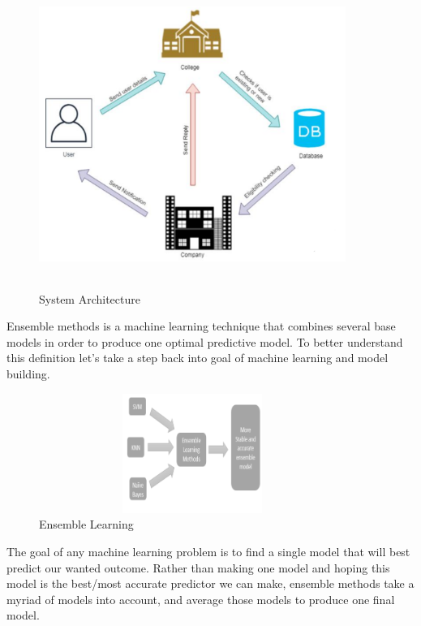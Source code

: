 \documentclass[12pt]{article}
\begin{document}
\begin{figure}[H]
\begin{center}
 \includegraphics[width=10cm, height=10cm]{L1P1}
\caption{System Architecture}
\end{center}
\end{figure}

Ensemble methods is a machine learning 
technique that combines several base models in order to 
produce one optimal predictive model. To better understand 
this definition let’s take a step back into goal of machine 
learning and model building.

\begin{figure}[H]
\begin{center}
 \includegraphics[width=10cm, height=3.9cm]{L1P2}
\caption{Ensemble Learning}
\end{center}
\end{figure}

The goal of any machine learning problem is to find a 
single model that will best predict our wanted outcome. Rather 
than making one model and hoping this model is the best/most 
accurate predictor we can make, ensemble methods take a 
myriad of models into account, and average those models to 
produce one final model.
\end{document}
